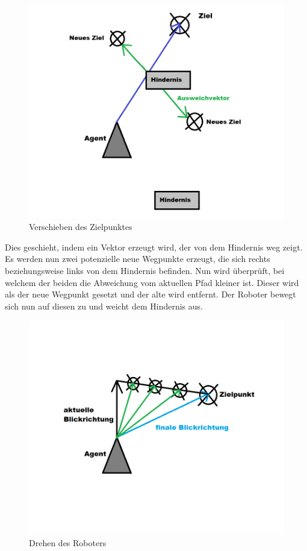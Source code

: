 \begin{figure}[h]
	\centering
	\includegraphics[height=0.3\pageheight,keepaspectratio]{pics/Avoidance3} 
	\caption{Verschieben des Zielpunktes}
\end{figure}
Dies geschieht, indem ein Vektor erzeugt wird, der von dem Hindernis weg zeigt. Es werden nun zwei potenzielle neue Wegpunkte erzeugt, die sich rechts beziehungsweise links von dem Hindernis befinden. Nun wird überprüft, bei welchem der beiden die Abweichung vom aktuellen Pfad kleiner ist. Dieser wird als der neue Wegpunkt gesetzt und der alte wird entfernt. Der Roboter bewegt sich nun auf diesen zu und weicht dem Hindernis aus.
\begin{figure}[h]
	\centering
	\includegraphics[height=0.3\pageheight,keepaspectratio]{pics/TurnTo} 
	\caption{Drehen des Roboters}
\end{figure}
